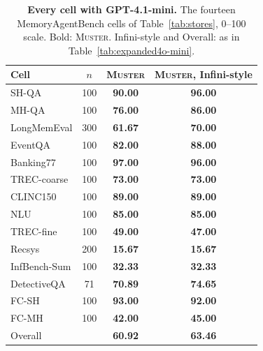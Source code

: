 \documentclass{article}
\newcommand{\tabfont}{\fontsize{7.5}{8.5}\selectfont\renewcommand{\arraystretch}{1.0}}
\newcommand{\sys}{\textsc{Muster}}
\begin{document}
\begin{table}[!htbp]
\centering\tabfont
\caption{\textbf{Every cell with GPT-4.1-mini.} The fourteen MemoryAgentBench cells of Table~\ref{tab:stores}, 0--100 scale. Bold: \sys{}. Infini-style and Overall: as in Table~\ref{tab:expanded4o-mini}.}
\label{tab:expanded4.1-mini}
\setlength{\tabcolsep}{4pt}\setlength{\aboverulesep}{0pt}\setlength{\belowrulesep}{0pt}\setlength{\extrarowheight}{0.8pt}
\begin{tabular}{lc>{\columncolor{oursbg}}c>{\columncolor{oursbg}}c}
\toprule
Cell & $n$ & \textbf{\sys{}} & \textbf{\sys{}, Infini-style} \\
\midrule
SH-QA & 100 & \textbf{90.00} & \textbf{96.00} \\
MH-QA & 100 & \textbf{76.00} & \textbf{86.00} \\
LongMemEval & 300 & \textbf{61.67} & \textbf{70.00} \\
EventQA & 100 & \textbf{82.00} & \textbf{88.00} \\
Banking77 & 100 & \textbf{97.00} & \textbf{96.00} \\
TREC-coarse & 100 & \textbf{73.00} & \textbf{73.00} \\
CLINC150 & 100 & \textbf{89.00} & \textbf{89.00} \\
NLU & 100 & \textbf{85.00} & \textbf{85.00} \\
TREC-fine & 100 & \textbf{49.00} & \textbf{47.00} \\
Recsys & 200 & \textbf{15.67} & \textbf{15.67} \\
InfBench-Sum & 100 & \textbf{32.33} & \textbf{32.33} \\
DetectiveQA & 71 & \textbf{70.89} & \textbf{74.65} \\
FC-SH & 100 & \textbf{93.00} & \textbf{92.00} \\
FC-MH & 100 & \textbf{42.00} & \textbf{45.00} \\
\midrule
Overall &  & \textbf{60.92} & \textbf{63.46} \\
\bottomrule
\end{tabular}
\end{table}
\end{document}
